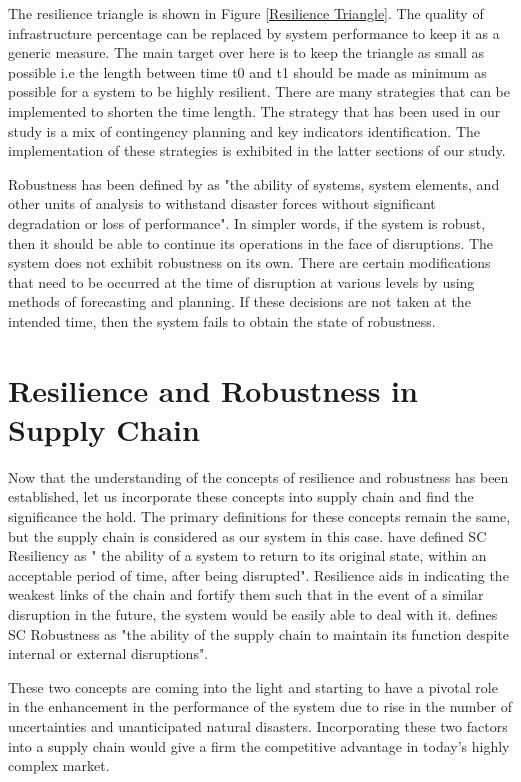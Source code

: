 The resilience triangle is shown in Figure \ref{Resilience Triangle}. The quality of infrastructure percentage can be replaced by system performance to keep it as a generic measure. The main target over here is to keep the triangle as small as possible i.e the length between time t0 and t1 should be made as minimum as possible for a system to be highly resilient. There are many strategies that can be implemented to shorten the time length. The strategy that has been used in our study is a mix of contingency planning and key indicators identification. The implementation of these strategies is exhibited in the latter sections of our study.

Robustness has been defined by \citep{Tierney2007} as "the ability of systems, system elements,
and other units of analysis to withstand disaster
forces without significant degradation or loss of
performance". In simpler words, if the system is robust, then it should be able to continue its operations in the face of disruptions. The system does not exhibit robustness on its own. There are certain modifications that need to be occurred at the time of disruption at various levels by using methods of forecasting and planning. If these decisions are not taken at the intended time, then the system fails to obtain the state of robustness. 

\newpage
\section{Resilience and Robustness in Supply Chain}
Now that the understanding of the concepts of resilience and robustness has been established, let us incorporate these concepts into supply chain and find the significance the hold. The primary definitions for these concepts remain the same, but the supply chain is considered as our system in this case. \citep{Brandon-JonesE.;SquireB.;Autry2014}  have defined SC Resiliency as " the ability of a system to return to its original state, within an acceptable period of time, after being disrupted". Resilience aids in indicating the weakest links of the chain and fortify them such that in the event of a similar disruption in the future, the system would be easily able to deal with it. \citep{Kitano2004} defines SC Robustness as "the ability of the supply chain to maintain its function despite internal or external disruptions".

These two concepts are coming into the light and  starting to have a pivotal role in the enhancement in the performance of the system due to rise in the number of uncertainties and unanticipated natural disasters. Incorporating these two factors into a supply chain would give a firm the competitive advantage in today's highly complex market.

